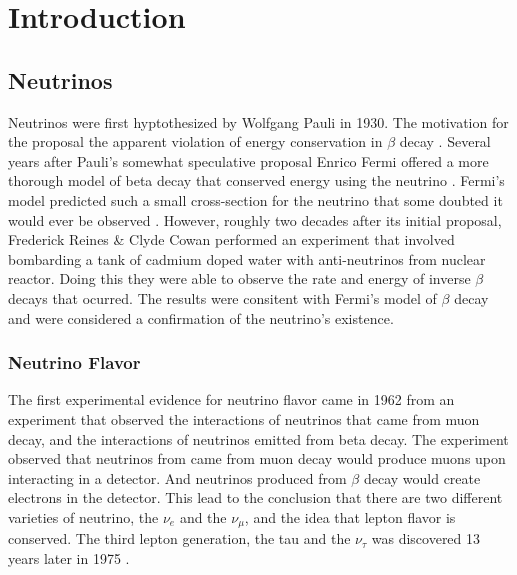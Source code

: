 
\chapter{Introduction}

\ifpdf
    \graphicspath{{introduction/figures/PNG/}{introduction/figures/PDF/}{introduction/figures/}}
\else
    \graphicspath{{introduction/figures/EPS/}{introduction/figures/}}
\fi


\section{Neutrinos}
Neutrinos were first hyptothesized by Wolfgang Pauli in 1930.
The motivation for the proposal the apparent violation of energy
conservation in $\beta$ decay \citep{pauli_letter}.
Several years after Pauli's somewhat speculative proposal Enrico Fermi offered
a more thorough model of beta decay that conserved energy using the neutrino
\citep{fermi_beta_decay}.
Fermi's model predicted such a small cross-section for the neutrino that some
doubted it would ever be observed \citep{bethe_impossible_to_observe}.
However, roughly two decades after its initial proposal, Frederick Reines \&
Clyde Cowan performed an experiment that involved bombarding a tank of cadmium
doped water with anti-neutrinos from nuclear reactor.
Doing this they were able to observe the rate and energy of inverse $\beta$
decays that ocurred.
The results were consitent with Fermi's model of $\beta$ decay and were
considered a confirmation of the neutrino's existence.

\subsection{Neutrino Flavor}
The first experimental evidence for neutrino flavor came in 1962 from an
experiment \citep{lederman_muon_flavor} that observed the interactions of
neutrinos that came from muon decay, and the interactions of neutrinos emitted
from beta decay.
The experiment observed that neutrinos from came from muon decay would produce
muons upon interacting in a detector.
And neutrinos produced from $\beta$ decay would create electrons in the
detector.
This lead to the conclusion that there are two different varieties of neutrino,
the $\nu_e$ and the $\nu_{\mu}$, and the idea that lepton flavor is conserved.
The third lepton generation, the tau and the $\nu_{\tau}$ was discovered 13
years later in 1975 \citep{tau_discovery}.

